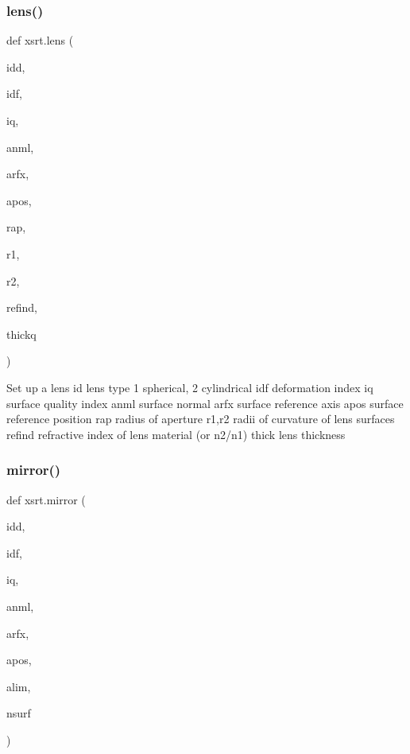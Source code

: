\subsubsection{\texorpdfstring{lens()}{lens()}}
{\footnotesize\ttfamily def xsrt.\+lens (\begin{DoxyParamCaption}\item[{}]{idd,  }\item[{}]{idf,  }\item[{}]{iq,  }\item[{}]{anml,  }\item[{}]{arfx,  }\item[{}]{apos,  }\item[{}]{rap,  }\item[{}]{r1,  }\item[{}]{r2,  }\item[{}]{refind,  }\item[{}]{thickq }\end{DoxyParamCaption})}

\begin{DoxyVerb}Set up a lens
    id       lens type 1 spherical, 2 cylindrical
    idf      deformation index
    iq       surface quality index
    anml     surface normal 
    arfx     surface reference axis
    apos     surface reference position
    rap      radius of aperture
    r1,r2    radii of curvature of lens surfaces
    refind   refractive index of lens material (or n2/n1)
    thick    lens thickness
\end{DoxyVerb}
 \mbox{\label{namespacexsrt_a9c2e7251116c1a1d304280b350bf5b2d}} 
\subsubsection{\texorpdfstring{mirror()}{mirror()}}
{\footnotesize\ttfamily def xsrt.\+mirror (\begin{DoxyParamCaption}\item[{}]{idd,  }\item[{}]{idf,  }\item[{}]{iq,  }\item[{}]{anml,  }\item[{}]{arfx,  }\item[{}]{apos,  }\item[{}]{alim,  }\item[{}]{nsurf }\end{DoxyParamCaption})}

